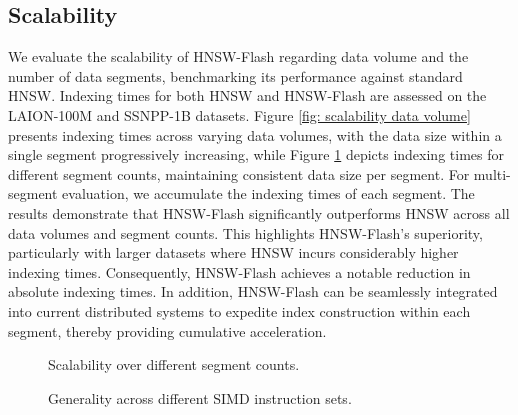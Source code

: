 \subsection{Scalability}
\label{subsec: scalability}
We evaluate the scalability of HNSW-Flash regarding data volume and the number of data segments, benchmarking its performance against standard HNSW. Indexing times for both HNSW and HNSW-Flash are assessed on the LAION-100M and SSNPP-1B datasets. Figure \ref{fig: scalability data volume} presents indexing times across varying data volumes, with the data size within a single segment progressively increasing, while Figure \ref{fig: scalability segments} depicts indexing times for different segment counts, maintaining consistent data size per segment. For multi-segment evaluation, we accumulate the indexing times of each segment. The results demonstrate that HNSW-Flash significantly outperforms HNSW across all data volumes and segment counts. This highlights HNSW-Flash's superiority, particularly with larger datasets where HNSW incurs considerably higher indexing times. Consequently, HNSW-Flash achieves a notable reduction in absolute indexing times. In addition, HNSW-Flash can be seamlessly integrated into current distributed systems to expedite index construction within each segment, thereby providing cumulative acceleration.

\begin{figure}
  \setlength{\abovecaptionskip}{0cm}
  \setlength{\belowcaptionskip}{0cm}
  \centering
  \footnotesize
  \hspace{0.15cm}
  \newline
  \caption{Scalability over different segment counts.}
  \label{fig: scalability segments}
  \vspace{-0.2cm}
\end{figure}

\begin{figure}
\vspace{-0.2cm}
  \setlength{\abovecaptionskip}{0cm}
  \setlength{\belowcaptionskip}{0cm}
  \centering
  \footnotesize
  \hspace{0.15cm}
  \newline
  \caption{{Generality across different SIMD instruction sets.}}
  \label{fig: generality simd}
  \vspace{-0.2cm}
\end{figure}

